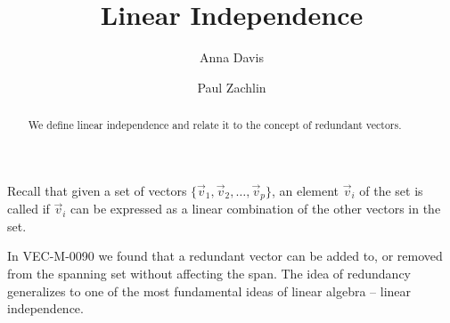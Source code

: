 \documentclass{ximera}
\author{Anna Davis \and Paul Zachlin} \title{Linear Independence} \license{CC-BY 4.0}
\begin{document}
\begin{abstract}
 We define linear independence and relate it to the concept of redundant vectors.
\end{abstract}
\maketitle


Recall that given a set of vectors $\{\vec{v}_1,\vec{v}_2,\ldots ,\vec{v}_p\}$, an element $\vec{v}_i$ of the set is called  if $\vec{v}_i$ can be expressed as a linear combination of the other vectors in the set.  

In VEC-M-0090 we found that a redundant vector can be added to, or removed from the spanning set without affecting the span.  The idea of redundancy generalizes to one of the most fundamental ideas of linear algebra -- linear independence.


\end{document}

